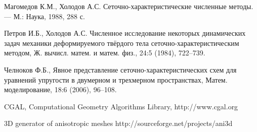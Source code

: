 \begin{thebibliography}{9}

 Магомедов К.М., Холодов А.С. 
Сеточно-характеристические численные методы. — М.: Наука, 1988, 288 с.

 Петров И.Б., Холодов А.С. 
Численное исследование некоторых динамических задач механики деформируемого 
твёрдого тела сеточно-характеристическим методом, 
Ж. вычисл. матем. и матем. физ., 24:5 (1984), 722–739.

 Челноков Ф.Б., Явное представление 
сеточно-характеристических схем для уравнений упругости в двумерном и
 трехмерном пространствах, Матем. моделирование, 18:6 (2006), 96–108.

 CGAL, Computational Geometry Algorithms Library, http://www.cgal.org

 3D generator of anisotropic meshes http://sourceforge.net/projects/ani3d

\end{thebibliography}














